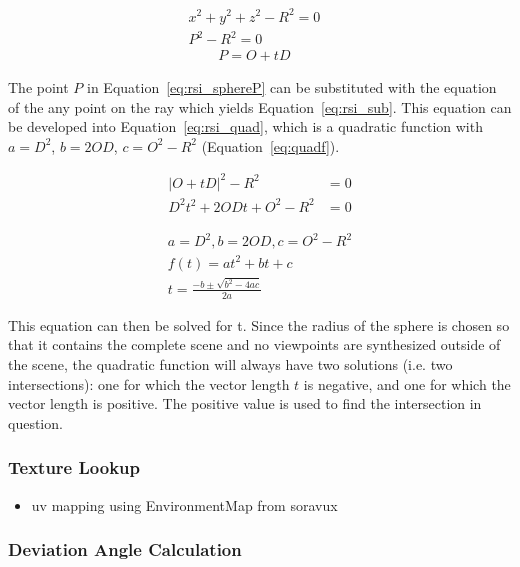 \begin{align}
  x^2 + y^2 + z^2 - R^2 = 0&\label{eq:rsi_spherefull}\\ 
  P^2 - R^2 = 0&\label{eq:rsi_sphereP}
\end{align} 
\begin{align}
  P = O + tD& \label{eq:rsi_point}
\end{align} 

The point $P$ in Equation~\ref{eq:rsi_sphereP} can be substituted with the equation of the any point on the ray which yields Equation~\ref{eq:rsi_sub}. This equation can be developed into Equation~\ref{eq:rsi_quad}, which is a quadratic function with $a = D^2$, $b = 2OD$, $c = O^2-R^2$ (Equation~\ref{eq:quadf}).

\begin{align}
  |O + tD|^2 - R^2 &= 0  \label{eq:rsi_sub}\\
  D^2 t^2 + 2ODt + O^2 - R^2 &= 0 \label{eq:rsi_quad}
\end{align}

\begin{align}
  a = D^2, b = 2OD, c = O^2-R^2 \\
  f(t) = at^2 + bt + c \label{eq:quadf}\\
  t = \frac{-b \pm \sqrt{b^2 - 4ac}}{2a} \label{eq:solvequadf}
\end{align}

This equation can then be solved for t. Since the radius of the sphere is chosen so that it contains the complete scene and no viewpoints are synthesized outside of the scene, the quadratic function will always have two solutions (i.e. two intersections): one for which the vector length $t$ is negative, and one for which the vector length is positive. The positive value is used to find the intersection in question.

\subsubsection{Texture Lookup}
\begin{itemize}
  \item uv mapping using EnvironmentMap from soravux
\end{itemize}

\subsubsection{Deviation Angle Calculation}

